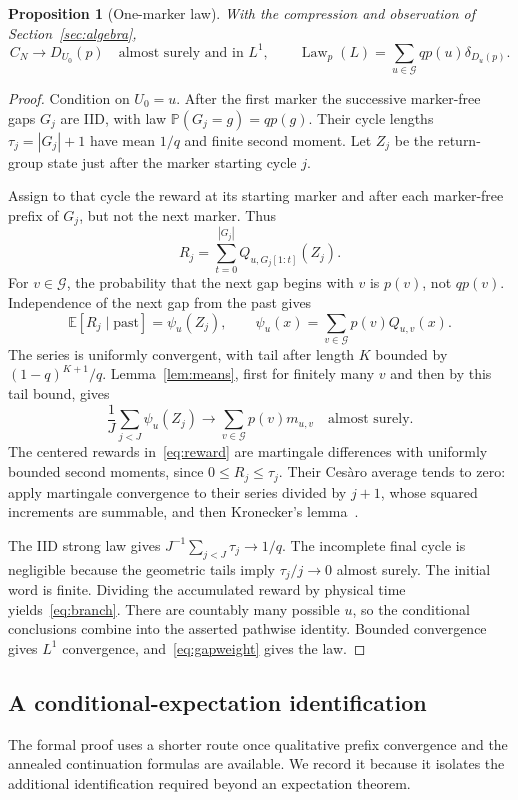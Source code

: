 \documentclass[11pt]{article}
\newtheorem{proposition}[theorem]{Proposition}
\theoremstyle{definition}
\theoremstyle{remark}
\newcommand{\E}{\mathbb E}
\newcommand{\PP}{\mathbb P}
\newcommand{\Law}{\operatorname{Law}}
\newcommand{\Gap}{\mathcal G}
\begin{document}
\begin{proposition}[One-marker law]\label{prop:one}
With the compression and observation of Section~\ref{sec:algebra},
\[
 C_N\longrightarrow D_{U_0}(p)\quad\text{almost surely and in }L^1,
 \qquad
 \Law_p(L)=\sum_{u\in\Gap}q p(u)\delta_{D_u(p)}.
\]
\end{proposition}
\begin{proof}
Condition on $U_0=u$. After the first marker the successive marker-free gaps $G_j$ are IID, with law $\PP(G_j=g)=q p(g)$. Their cycle lengths $\tau_j=|G_j|+1$ have mean $1/q$ and finite second moment. Let $Z_j$ be the return-group state just after the marker starting cycle $j$.

Assign to that cycle the reward at its starting marker and after each marker-free prefix of $G_j$, but not the next marker. Thus
\[
 R_j=\sum_{t=0}^{|G_j|}Q_{u,G_j[1:t]}(Z_j).
\]
For $v\in\Gap$, the probability that the next gap begins with $v$ is $p(v)$, not $q p(v)$. Independence of the next gap from the past gives
\begin{equation}\label{eq:reward}
 \E[R_j\mid\text{past}]=\psi_u(Z_j),\qquad
 \psi_u(x)=\sum_{v\in\Gap}p(v)Q_{u,v}(x).
\end{equation}
The series is uniformly convergent, with tail after length $K$ bounded by $(1-q)^{K+1}/q$. Lemma~\ref{lem:means}, first for finitely many $v$ and then by this tail bound, gives
\[
 \frac1J\sum_{j<J}\psi_u(Z_j)\longrightarrow
 \sum_{v\in\Gap}p(v)m_{u,v}\quad\text{almost surely}.
\]
The centered rewards in~\eqref{eq:reward} are martingale differences with uniformly bounded second moments, since $0\leq R_j\leq\tau_j$. Their Ces\`aro average tends to zero: apply martingale convergence to their series divided by $j+1$, whose squared increments are summable, and then Kronecker's lemma~\cite[Theorems 4.4.6 and 2.5.9]{Durrett2019}.

The IID strong law gives $J^{-1}\sum_{j<J}\tau_j\to1/q$. The incomplete final cycle is negligible because the geometric tails imply $\tau_j/j\to0$ almost surely. The initial word is finite. Dividing the accumulated reward by physical time yields~\eqref{eq:branch}. There are countably many possible $u$, so the conditional conclusions combine into the asserted pathwise identity. Bounded convergence gives $L^1$ convergence, and~\eqref{eq:gapweight} gives the law.
\end{proof}

\subsection{A conditional-expectation identification}
The formal proof uses a shorter route once qualitative prefix convergence and the annealed continuation formulas are available. We record it because it isolates the additional identification required beyond an expectation theorem.
\end{document}
